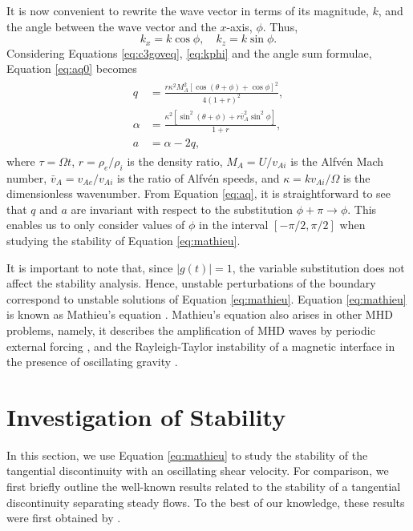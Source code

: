 It is now convenient to rewrite the wave vector in terms of its magnitude, $k$, and the angle between the wave vector and the $x$-axis, $\phi$.
Thus,
%
\begin{equation}
\label{eq:kphi}
k_x = k\cos\phi, \quad k_z = k\sin\phi.
\end{equation}
%
Considering Equations \eqref{eq:c3goveq}, \eqref{eq:kphi} and the angle sum formulae, Equation \eqref{eq:aq0} becomes
%
\begin{align}
\begin{split}
\label{eq:aq}
q & = \frac{r \kappa^2 M_A^2[\cos(\theta + \phi) + \cos\phi]^2}{4 (1 + r)^2},
\\
\alpha & = \frac{\kappa^2[\sin^2(\theta + \phi) + r \bar v_A^2 \sin^2\phi]}{1 + r}, 
\\
a & = \alpha - 2 q,
\end{split}
\end{align}
%
where $\tau = \Omega t$\/, $r = \rho_e / \rho_i$ is the density ratio, $M_A = U / v_{Ai}$ is the Alfv\'en Mach number,  $\bar v_A = v_{Ae} / v_{Ai}$ is the ratio of Alfv\'en speeds, and $\kappa = k v_{Ai} / \Omega$ is the dimensionless wavenumber.
From Equation \eqref{eq:aq}, it is straightforward to see that $q$ and $a$ are invariant with respect to the substitution $\phi + \pi \to \phi$.
This enables us to only consider values of $\phi$ in the interval $[-\pi/2, \pi/2]$ when studying the stability of Equation \eqref{eq:mathieu}.

It is important to note that, since $|g(t)| = 1$, the variable substitution does not affect the stability analysis.
Hence, unstable perturbations of the boundary correspond to unstable solutions of Equation \eqref{eq:mathieu}.
Equation \eqref{eq:mathieu} is known as Mathieu's equation \citep{McLachlan1946}.
Mathieu's equation also arises in other MHD problems, namely, it describes the amplification of MHD waves by periodic external forcing \citep[e.g.][]{Zaqarashvili2000,Zaqarashvili2002,Zaqarashvili2005}, and the Rayleigh-Taylor instability of a magnetic interface in the presence of oscillating gravity \citep{Ruderman2018}.

\section{Investigation of Stability}
\label{sec:stab}

In this section, we use Equation \eqref{eq:mathieu} to study the stability of the tangential discontinuity with an oscillating shear velocity.
For comparison, we first briefly outline the well-known results related to the stability of a tangential discontinuity separating steady flows.
To the best of our knowledge, these results were first obtained by \cite{Syrovatskii1957} \citep[see also][]{Chandrasekhar1961}.
\vspace*{3mm}

